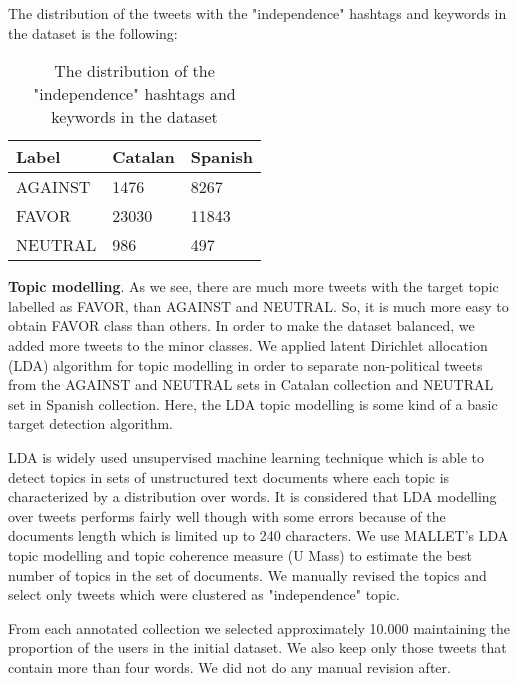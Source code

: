 \documentclass[10pt, a4paper]{article}
\begin{document}
The distribution of the tweets with the "independence" hashtags and keywords in the dataset is the following: 

\begin{table}[!h]
\begin{center}
\begin{tabularx}{\columnwidth}{|l|l|X|}

      \hline
        Label&Catalan&Spanish\\
      \hline
        AGAINST & 1476&8267\\
      \hline
        FAVOR & 23030&11843\\
      \hline
        NEUTRAL & 986&497\\
      \hline

\end{tabularx}
\caption{The distribution of the "independence" hashtags and keywords in the dataset}
 \end{center}
\end{table}

\textbf{Topic modelling}. As we see, there are much more tweets with the target topic labelled as FAVOR, than AGAINST and NEUTRAL. So, it is much more easy to obtain FAVOR class than others. In order to make the dataset balanced, we added more tweets to the minor classes. We applied latent Dirichlet allocation (LDA) algorithm \cite{Blei:2003:LDA:944919.944937} for topic modelling in order to separate non-political tweets from the AGAINST and NEUTRAL sets in Catalan collection and NEUTRAL set in Spanish collection. Here, the LDA topic modelling is some kind of a basic target detection algorithm.

LDA is widely used unsupervised machine learning technique which is able to detect topics in sets of unstructured text documents where each topic is characterized by a distribution over words. It is considered that LDA modelling over tweets performs fairly well though with some errors because of the documents length which is limited up to 240 characters. We use MALLET's LDA \cite{McCallumMALLET} topic modelling and topic coherence measure (U Mass) to estimate the best number of topics in the set of documents. We manually revised the topics and select only tweets which were clustered  as "independence" topic. 

From each annotated collection we selected approximately 10.000 maintaining the proportion of the users in the initial dataset. We also keep only those tweets that contain more than four words. We did not do any manual revision after. 
\end{document}
